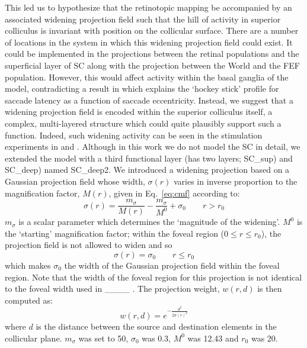 \documentclass{frontiersSCNS}
\begin{document}
This led us to hypothesize that the retinotopic mapping be accompanied
by an associated widening projection field such that the hill of
activity in superior colliculus is invariant with position on the
collicular surface. There are a number of locations in the system in
which this widening projection field could exist. It could be
implemented in the projections between the retinal populations and the
superficial layer of SC along with the projection between the World
and the FEF population. However, this would affect activity within the
basal ganglia of the model, contradicting a result
in \cite{cope_basal_2017} which explains the `hockey stick' profile
for saccade latency as a function of saccade eccentricity. Instead, we
suggest that a widening projection field is encoded within the
superior colliculus itself, a complex, multi-layered structure which
could quite plausibly support such a function. Indeed, such widening
activity can be seen in the stimulation experiments
in \cite{vokoun_intralaminar_2010}
and \cite{vokoun_response_2014}. Although in this work we do not model
the SC in detail, we extended the model with a third functional layer
(\ccg has two layers; SC\_sup) and SC\_deep) named SC\_deep2. We
introduced a widening projection based on a Gaussian projection field
whose width, $\sigma(r)$ varies in inverse proportion to the 
magnification factor, $M(r)$, given in Eq.~\ref{eq:cmf} according to:
\begin{equation} \label{eq:sigmar}
\sigma(r) = \frac{m_{\sigma}}{M(r)} - \frac{m_{\sigma}}{M^0} + \sigma_0 \qquad r > r_0
\end{equation}
$m_{\sigma}$ is a scalar parameter which determines the `magnitude
of the widening'. $M^0$ is the `starting' magnification factor; 
within the foveal region ($0 \leq r \leq r_0$), the projection field 
is not allowed to widen and so
\begin{equation} \label{eq:sigmar2}
\sigma(r) = \sigma_0 \qquad r \leq r_0
\end{equation}
which makes $\sigma_0$ the width of the Gaussian projection field
within the foveal region. Note that the width of the foveal region 
for this projection is not identical to the foveal width used
in \_\_\_\_ .
The  projection weight, $w(r,d)$ is then 
computed as:
\begin{equation} \label{eq:widening}
w(r,d) = e^{-\frac{d^2}{2\sigma\left(r\right)^2}}
\end{equation}
where $d$ is the distance between the source and destination 
elements in the collicular plane.  $m_\sigma$ was set to 50, $\sigma_0$
was 0.3, $M^0$ was 12.43 and $r_0$ was 20.
\end{document}
